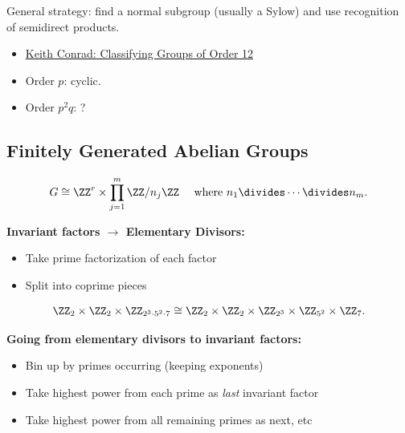 General strategy: find a normal subgroup (usually a Sylow) and use
recognition of semidirect products.

\begin{itemize}
\tightlist
\item
  \href{https://kconrad.math.uconn.edu/blurbs/grouptheory/group12.pdf}{Keith
  Conrad: Classifying Groups of Order 12}
\item
  Order \(p\): cyclic.
\item
  Order \(p^2q\): ?
\end{itemize}

\hypertarget{finitely-generated-abelian-groups}{%
\subsection{Finitely Generated Abelian
Groups}\label{finitely-generated-abelian-groups}}

\begin{definition}

\begin{align*}
G \cong \ZZ^r \times \prod_{j=1}^m \ZZ/n_j\ZZ
\quad \text{ where } n_1 \divides \cdots \divides n_m
.\end{align*}

\end{definition}

\textbf{Invariant factors \(\to\) Elementary Divisors:}

\begin{itemize}
\tightlist
\item
  Take prime factorization of each factor
\item
  Split into coprime pieces
\end{itemize}

\begin{example}

\begin{align*}
\ZZ_2 \times \ZZ_2 \times \ZZ_{2^3 \cdot 5^2 \cdot 7}
\cong
\ZZ_2 \times \ZZ_2 \times \ZZ_{2^3} \times \ZZ_{5^2} \times \ZZ_7
.\end{align*}

\end{example}

\textbf{Going from elementary divisors to invariant factors:}

\begin{itemize}
\tightlist
\item
  Bin up by primes occurring (keeping exponents)
\item
  Take highest power from each prime as \emph{last} invariant factor
\item
  Take highest power from all remaining primes as next, etc
\end{itemize}

